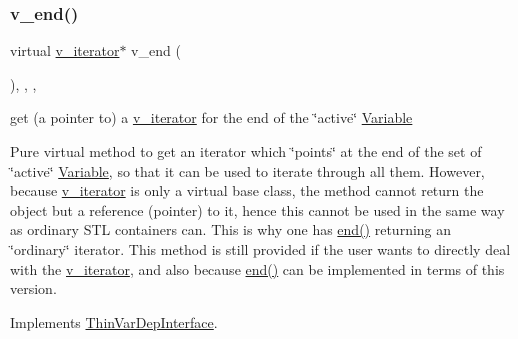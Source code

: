 \subsubsection{\texorpdfstring{v\+\_\+end()}{v\_end()}\hspace{0.1cm}{\footnotesize\ttfamily [1/2]}}
{\footnotesize\ttfamily virtual \mbox{\hyperlink{class_s_m_spp__di__unipi__it_1_1_linear_function_1_1v__iterator}{v\+\_\+iterator}}$\ast$ v\+\_\+end (\begin{DoxyParamCaption}\item[{void}]{ }\end{DoxyParamCaption})\hspace{0.3cm}{\ttfamily [inline]}, {\ttfamily [final]}, {\ttfamily [override]}, {\ttfamily [virtual]}}



get (a pointer to) a \mbox{\hyperlink{class_s_m_spp__di__unipi__it_1_1_linear_function_1_1v__iterator}{v\+\_\+iterator}} for the end of the \char`\"{}active\char`\"{} \mbox{\hyperlink{class_s_m_spp__di__unipi__it_1_1_variable}{Variable}} 

Pure virtual method to get an iterator which \char`\"{}points\char`\"{} at the end of the set of \char`\"{}active\char`\"{} \mbox{\hyperlink{class_s_m_spp__di__unipi__it_1_1_variable}{Variable}}, so that it can be used to iterate through all them. However, because \mbox{\hyperlink{class_s_m_spp__di__unipi__it_1_1_linear_function_1_1v__iterator}{v\+\_\+iterator}} is only a virtual base class, the method cannot return the object but a reference (pointer) to it, hence this cannot be used in the same way as ordinary S\+TL containers can. This is why one has \mbox{\hyperlink{group___thin_var_dep_interface___c_l_a_s_s_e_s_gae1175d5cbc6627e3e49ed9bcb58ffce9}{end()}} returning an \char`\"{}ordinary\char`\"{} iterator. This method is still provided if the user wants to directly deal with the \mbox{\hyperlink{class_s_m_spp__di__unipi__it_1_1_linear_function_1_1v__iterator}{v\+\_\+iterator}}, and also because \mbox{\hyperlink{group___thin_var_dep_interface___c_l_a_s_s_e_s_gae1175d5cbc6627e3e49ed9bcb58ffce9}{end()}} can be implemented in terms of this version. 

Implements \mbox{\hyperlink{group___thin_var_dep_interface___c_l_a_s_s_e_s_ga422dd4393326b2da21dbef0aa0a85bee}{Thin\+Var\+Dep\+Interface}}.

\mbox{\label{class_s_m_spp__di__unipi__it_1_1_linear_function_abb9e25cdff71595b6c21f36db96242b0}} 
